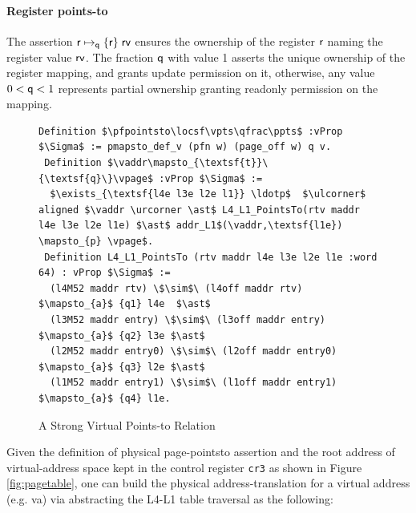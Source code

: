 \paragraph{Register points-to} The assertion $\mathsf{r}\mapsto_{\mathsf{q}}\{\mathsf{r}\}\;\mathsf{rv}$ ensures the ownership of the register $\mathsf{r}$ naming the register value $\mathsf{rv}$. The fraction $\mathsf{q}$ with value 1 asserts the unique ownership of the register mapping, and grants update permission on it, otherwise, any value $0 < \mathsf{q} <1$ represents partial ownership granting readonly permission on the mapping.
\begin{figure}
  \begin{lstlisting}[language=Coq]
 Definition $\pfpointsto\locsf\vpts\qfrac\ppts$ :vProp $\Sigma$ := pmapsto_def_v (pfn w) (page_off w) q v.
 Definition $\vaddr\mapsto_{\textsf{t}}\{\textsf{q}\}\vpage$ :vProp $\Sigma$ := 
  $\exists_{\textsf{l4e l3e l2e l1}} \ldotp$  $\ulcorner$ aligned $\vaddr \urcorner \ast$ L4_L1_PointsTo(rtv maddr l4e l3e l2e l1e) $\ast$ addr_L1$(\vaddr,\textsf{l1e}) \mapsto_{p} \vpage$.
 Definition L4_L1_PointsTo (rtv maddr l4e l3e l2e l1e :word 64) : vProp $\Sigma$ :=
  (l4M52 maddr rtv) \$\sim$\ (l4off maddr rtv) $\mapsto_{a}$ {q1} l4e  $\ast$
  (l3M52 maddr entry) \$\sim$\ (l3off maddr entry)  $\mapsto_{a}$ {q2} l3e $\ast$ 
  (l2M52 maddr entry0) \$\sim$\ (l2off maddr entry0) $\mapsto_{a}$ {q3} l2e $\ast$
  (l1M52 maddr entry1) \$\sim$\ (l1off maddr entry1) $\mapsto_{a}$ {q4} l1e.
\end{lstlisting}
\caption{A Strong Virtual Points-to Relation}
  \label{fig:strongvirtualpointsto}
\end{figure}
Given the definition of physical page-pointsto assertion and the root address of virtual-address space kept in the control register \lstinline{cr3} as shown in Figure \ref{fig:pagetable},  one can build the physical address-translation for a virtual address (e.g. \textsf{va}) via abstracting the L4-L1 table traversal as the following:
